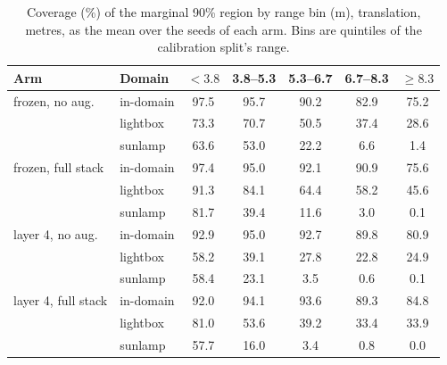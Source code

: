 \begin{table}[ht]
  \caption{Coverage (\%) of the marginal 90\% region by range bin (m), translation, metres, as the mean over the seeds of each arm. Bins are quintiles of the calibration split's range.}
  \label{tab:rangebins-translation-metres}
  \centering
  \scriptsize
  \setlength{\tabcolsep}{4pt}
  \begin{tabular}{l l ccccc}
    \toprule
    Arm & Domain & $<3.8$ & 3.8--5.3 & 5.3--6.7 & 6.7--8.3 & $\geq8.3$ \\
    \midrule
    frozen, no aug. & in-domain & 97.5 & 95.7 & 90.2 & 82.9 & 75.2 \\
     & lightbox & 73.3 & 70.7 & 50.5 & 37.4 & 28.6 \\
     & sunlamp & 63.6 & 53.0 & 22.2 & 6.6 & 1.4 \\
    \midrule
    frozen, full stack & in-domain & 97.4 & 95.0 & 92.1 & 90.9 & 75.6 \\
     & lightbox & 91.3 & 84.1 & 64.4 & 58.2 & 45.6 \\
     & sunlamp & 81.7 & 39.4 & 11.6 & 3.0 & 0.1 \\
    \midrule
    layer 4, no aug. & in-domain & 92.9 & 95.0 & 92.7 & 89.8 & 80.9 \\
     & lightbox & 58.2 & 39.1 & 27.8 & 22.8 & 24.9 \\
     & sunlamp & 58.4 & 23.1 & 3.5 & 0.6 & 0.1 \\
    \midrule
    layer 4, full stack & in-domain & 92.0 & 94.1 & 93.6 & 89.3 & 84.8 \\
     & lightbox & 81.0 & 53.6 & 39.2 & 33.4 & 33.9 \\
     & sunlamp & 57.7 & 16.0 & 3.4 & 0.8 & 0.0 \\
    \bottomrule
  \end{tabular}
\end{table}
